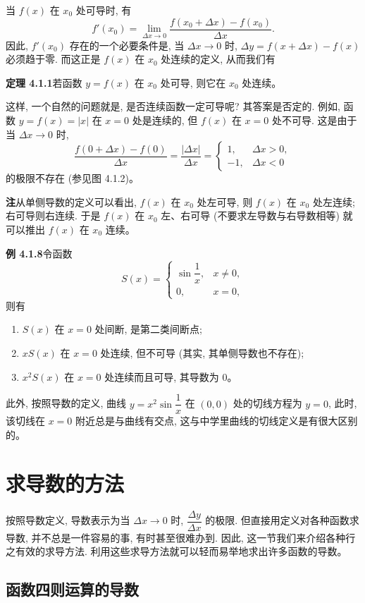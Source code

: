 \documentclass[UTF8, 12pt, fontset=fandol, oneside]{ctexart}
\begin{document}
当 $f(x)$ 在 $x_0$ 处可导时, 有
\[
  f'(x_0)=
  \lim_{\Delta x\to0}
  \frac{f(x_0+\Delta x)-f(x_0)}{\Delta x}.
\]
因此, $f'(x_0)$ 存在的一个必要条件是, 当 $\Delta x\to0$ 时, $\Delta y=f(x+\Delta x)-f(x)$ 必须趋于零. 而这正是 $f(x)$ 在 $x_0$ 处连续的定义, 从而我们有

\noindent\textbf{定理 4.1.1}\quad 若函数 $y=f(x)$ 在 $x_0$ 处可导, 则它在 $x_0$ 处连续。

这样, 一个自然的问题就是, 是否连续函数一定可导呢? 其答案是否定的. 例如, 函数 $y=f(x)=|x|$ 在 $x=0$ 处是连续的, 但 $f(x)$ 在 $x=0$ 处不可导. 这是由于当 $\Delta x\to0$ 时,
\[
  \frac{f(0+\Delta x)-f(0)}{\Delta x}
  =
  \frac{|\Delta x|}{\Delta x}
  =
  \begin{cases}
    1, & \Delta x>0,\\
    -1, & \Delta x<0
  \end{cases}
\]
的极限不存在 (参见图 4.1.2)。

\noindent\textbf{注}\quad 从单侧导数的定义可以看出, $f(x)$ 在 $x_0$ 处左可导, 则 $f(x)$ 在 $x_0$ 处左连续; 右可导则右连续. 于是 $f(x)$ 在 $x_0$ 左、右可导 (不要求左导数与右导数相等) 就可以推出 $f(x)$ 在 $x_0$ 连续。

\noindent\textbf{例 4.1.8}\quad 令函数
\[
  S(x)=
  \begin{cases}
    \sin\dfrac1x, & x\ne0,\\
    0, & x=0,
  \end{cases}
\]
则有
\begin{enumerate}
  \item $S(x)$ 在 $x=0$ 处间断, 是第二类间断点;
  \item $xS(x)$ 在 $x=0$ 处连续, 但不可导 (其实, 其单侧导数也不存在);
  \item $x^2S(x)$ 在 $x=0$ 处连续而且可导, 其导数为 $0$。
\end{enumerate}
此外, 按照导数的定义, 曲线 $y=x^2\sin\dfrac1x$ 在 $(0,0)$ 处的切线方程为 $y=0$, 此时, 该切线在 $x=0$ 附近总是与曲线有交点, 这与中学里曲线的切线定义是有很大区别的。

\section{求导数的方法}

按照导数定义, 导数表示为当 $\Delta x\to0$ 时, $\dfrac{\Delta y}{\Delta x}$ 的极限. 但直接用定义对各种函数求导数, 并不总是一件容易的事, 有时甚至很难办到. 因此, 这一节我们来介绍各种行之有效的求导方法. 利用这些求导方法就可以轻而易举地求出许多函数的导数。

\subsection{函数四则运算的导数}
\end{document}
